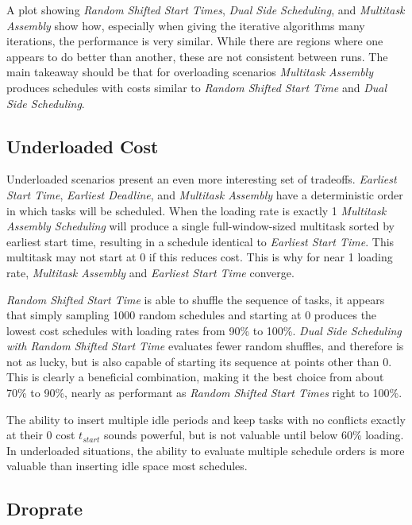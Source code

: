 \documentclass[conference]{IEEEtran}
\begin{document}
A plot showing \emph{Random Shifted Start Times}, \emph{Dual Side Scheduling}, and \emph{Multitask Assembly} show how, especially when giving the iterative algorithms many iterations, the performance is very similar.
While there are regions where one appears to do better than another, these are not consistent between runs.
The main takeaway should be that for overloading scenarios \emph{Multitask Assembly} produces schedules with costs similar to \emph{Random Shifted Start Time} and \emph{Dual Side Scheduling}.

\subsection{Underloaded Cost}

\begin{figure}[h]
	\centering
	{}
\end{figure}

Underloaded scenarios present an even more interesting set of tradeoffs.
\emph{Earliest Start Time}, \emph{Earliest Deadline}, and \emph{Multitask Assembly} have a deterministic order in which tasks will be scheduled.
When the loading rate is exactly 1 \emph{Multitask Assembly Scheduling} will produce a single full-window-sized multitask sorted by earliest start time, resulting in a schedule identical to \emph{Earliest Start Time}.
This multitask may not start at 0 if this reduces cost. This is why for near 1 loading rate, \emph{Multitask Assembly} and \emph{Earliest Start Time} converge.

\emph{Random Shifted Start Time} is able to shuffle the sequence of tasks, it appears that simply sampling 1000 random schedules and starting at 0 produces the lowest cost schedules with loading rates from 90\% to 100\%.
\emph{Dual Side Scheduling with Random Shifted Start Time} evaluates fewer random shuffles, and therefore is not as lucky, but is also capable of starting its sequence at points other than 0.
This is clearly a beneficial combination, making it the best choice from about 70\% to 90\%, nearly as performant as \emph{Random Shifted Start Times} right to 100\%.

The ability to insert multiple idle periods and keep tasks with no conflicts exactly at their 0 cost $t_{start}$ sounds powerful, but is not valuable until below 60\% loading.
In underloaded situations, the ability to evaluate multiple schedule orders is more valuable than inserting idle space most schedules.

\subsection{Droprate}
\end{document}

